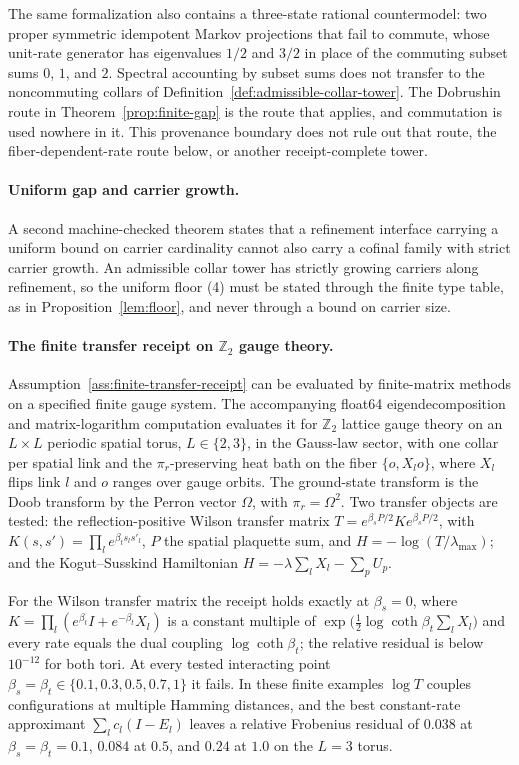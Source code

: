 \documentclass[11pt]{article}
\numberwithin{equation}{section}
\theoremstyle{remark}
\begin{document}
The same formalization also contains a three-state rational countermodel: two
proper symmetric idempotent Markov projections that fail to commute, whose
unit-rate generator has eigenvalues \(1/2\) and \(3/2\) in place of the
commuting subset sums \(0\), \(1\), and \(2\). Spectral accounting by subset
sums does not transfer to the noncommuting collars of
Definition~\ref{def:admissible-collar-tower}. The Dobrushin route in
Theorem~\ref{prop:finite-gap} is the route that applies, and commutation is
used nowhere in it.  This provenance boundary does not rule out that route,
the fiber-dependent-rate route below, or another receipt-complete tower.

\paragraph{Uniform gap and carrier growth.}
A second machine-checked theorem states that a refinement interface carrying
a uniform bound on carrier cardinality cannot also carry a cofinal family with
strict carrier growth. An admissible collar tower has strictly growing
carriers along refinement, so the uniform floor (4) must be stated through
the finite type table, as in Proposition~\ref{lem:floor}, and never through a
bound on carrier size.

\paragraph{The finite transfer receipt on \texorpdfstring{\(\mathbb Z_2\)}{Z2} gauge theory.}
Assumption~\ref{ass:finite-transfer-receipt} can be evaluated by finite-matrix
methods on a specified finite gauge system. The accompanying float64
eigendecomposition and matrix-logarithm computation evaluates it for
\(\mathbb Z_2\) lattice
gauge theory on an \(L\times L\) periodic spatial torus, \(L\in\{2,3\}\), in
the Gauss-law sector, with one collar per spatial link and the
\(\pi_r\)-preserving heat bath on the fiber \(\{o,X_lo\}\), where \(X_l\)
flips link \(l\) and \(o\) ranges over gauge orbits. The ground-state
transform is the Doob transform by the Perron vector \(\Omega\), with
\(\pi_r=\Omega^2\). Two transfer objects are tested: the reflection-positive
Wilson transfer matrix \(T=e^{\beta_sP/2}Ke^{\beta_sP/2}\), with
\(K(s,s')=\prod_l e^{\beta_ts_ls'_l}\), \(P\) the spatial plaquette sum, and
\(H=-\log(T/\lambda_{\max})\); and the Kogut--Susskind Hamiltonian
\(H=-\lambda\sum_lX_l-\sum_pU_p\).

For the Wilson transfer matrix the receipt holds exactly at \(\beta_s=0\),
where \(K=\prod_l(e^{\beta_t}I+e^{-\beta_t}X_l)\) is a constant multiple
of \(\exp\bigl(\tfrac12\log\coth\beta_t\sum_lX_l\bigr)\) and every rate
equals the dual coupling \(\log\coth\beta_t\); the relative residual is
below \(10^{-12}\) for both tori. At every tested interacting point
\(\beta_s=\beta_t\in\{0.1,0.3,0.5,0.7,1\}\) it fails. In these finite
examples \(\log T\) couples configurations at multiple Hamming distances,
and the best constant-rate approximant
\(\sum_lc_l(I-E_l)\) leaves a relative Frobenius residual of \(0.038\) at
\(\beta_s=\beta_t=0.1\), \(0.084\) at \(0.5\), and \(0.24\) at \(1.0\) on the
\(L=3\) torus.
\end{document}
